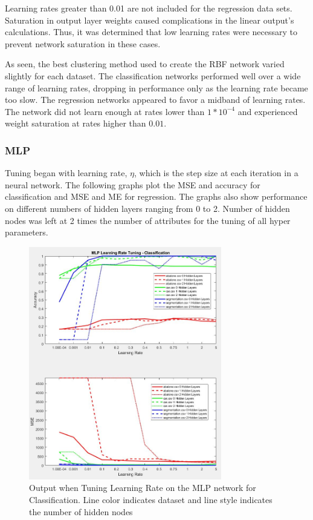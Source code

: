 \documentclass[twoside,10pt]{article}
\begin{document}
Learning rates greater than 0.01 are not included for the regression data sets. Saturation in output layer weights caused complications in the linear output's calculations. Thus, it was determined that low learning rates were necessary to prevent network saturation in these cases.

As seen, the best clustering method used to create the RBF network varied slightly for each dataset. The classification networks performed well over a wide range of learning rates, dropping in performance only as the learning rate became too slow. The regression networks appeared to favor a midband of learning rates. The network did not learn enough at rates lower than $1*10^{-4}$ and experienced weight saturation at rates higher than $0.01$.


\subsubsection{MLP}
Tuning began with learning rate, $\eta$, which is the step size at each iteration in a neural network. The following graphs plot the MSE and accuracy for classification and MSE and ME for regression. The graphs also show performance on different numbers of hidden layers ranging from 0 to 2. Number of hidden nodes was left at 2 times the number of attributes for the tuning of all hyper parameters.
\begin{figure}[h]
	\centering
	\includegraphics[height=4in]{FINAL_FIGS/MLP_LR_TUNING_CLASS.JPG}
	\caption{Output when Tuning Learning Rate on the MLP network for Classification. Line color indicates dataset and line style indicates the number of hidden nodes}
\end{figure}
\end{document}

